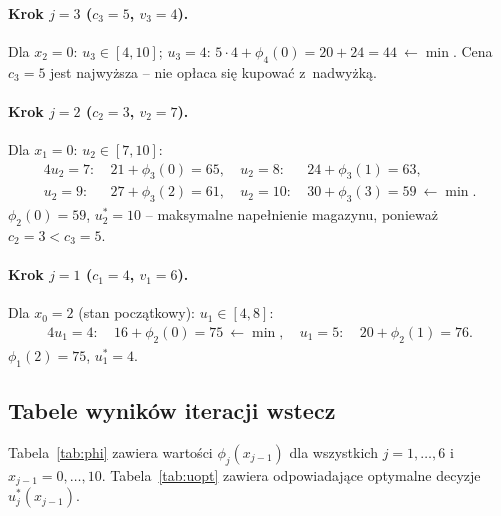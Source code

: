 \documentclass[12pt,a4paper]{article}
\begin{document}
\paragraph{Krok $j = 3$ \quad ($c_3 = 5$, $v_3 = 4$).}
Dla $x_2 = 0$: $u_3 \in [4,10]$;
$u_3 = 4$: $5{\cdot}4 + \phi_4(0) = 20{+}24 = 44\ \leftarrow \min$.
Cena $c_3 = 5$ jest najwy\.zsza -- nie op\l{}aca si\k{e} kupowa\'c z~nadwy\.zk\k{a}.

\paragraph{Krok $j = 2$ \quad ($c_2 = 3$, $v_2 = 7$).}
Dla $x_1 = 0$: $u_2 \in [7,10]$:
\begin{alignat*}{4}
    u_2=7{:}&\ 21+\phi_3(0)=65, &\ u_2=8{:}&\ 24+\phi_3(1)=63, \\
    u_2=9{:}&\ 27+\phi_3(2)=61, &\ u_2=10{:}&\ 30+\phi_3(3)=59\ \leftarrow \min.
\end{alignat*}
$\phi_2(0) = 59$, $u_2^* = 10$ -- maksymalne nape\l{}nienie magazynu,
poniewa\.z $c_2=3 < c_3=5$.

\paragraph{Krok $j = 1$ \quad ($c_1 = 4$, $v_1 = 6$).}
Dla $x_0 = 2$ (stan pocz\k{a}tkowy): $u_1 \in [4,8]$:
\begin{alignat*}{4}
    u_1=4{:}&\ 16+\phi_2(0)=75\ \leftarrow \min, &\ u_1=5{:}&\ 20+\phi_2(1)=76.
\end{alignat*}
$\phi_1(2) = 75$, $u_1^* = 4$.

\subsection{Tabele wynik\'ow iteracji wstecz}

Tabela~\ref{tab:phi} zawiera warto\'sci $\phi_j(x_{j-1})$ dla wszystkich
$j = 1,\ldots,6$ i $x_{j-1} = 0,\ldots,10$.
Tabela~\ref{tab:uopt} zawiera odpowiadaj\k{a}ce optymalne decyzje
$u_j^*(x_{j-1})$.
\end{document}
